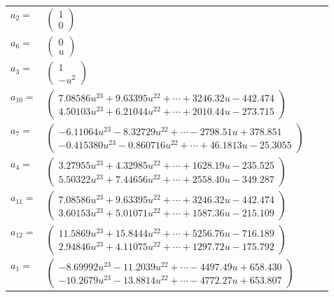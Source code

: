 \documentclass[1p]{elsarticle_modified}
\theoremstyle{definition}
\begin{document}
\begin{tabular}{m{7pt} m{180pt} m{7pt} m{180pt} }
\flushright $a_{2}=$&$\begin{pmatrix}1\\0\end{pmatrix}$ \\
\flushright $a_{6}=$&$\begin{pmatrix}0\\u\end{pmatrix}$ \\
\flushright $a_{3}=$&$\begin{pmatrix}1\\- u^2\end{pmatrix}$ \\
\flushright $a_{10}=$&$\begin{pmatrix}7.08586 u^{23}+9.63395 u^{22}+\cdots+3246.32 u-442.474\\4.50103 u^{23}+6.21044 u^{22}+\cdots+2010.44 u-273.715\end{pmatrix}$ \\
\flushright $a_{7}=$&$\begin{pmatrix}-6.11064 u^{23}-8.32729 u^{22}+\cdots-2798.51 u+378.851\\-0.415380 u^{23}-0.860716 u^{22}+\cdots+46.1813 u-25.3055\end{pmatrix}$ \\
\flushright $a_{4}=$&$\begin{pmatrix}3.27955 u^{23}+4.32985 u^{22}+\cdots+1628.19 u-235.525\\5.50322 u^{23}+7.44656 u^{22}+\cdots+2558.40 u-349.287\end{pmatrix}$ \\
\flushright $a_{11}=$&$\begin{pmatrix}7.08586 u^{23}+9.63395 u^{22}+\cdots+3246.32 u-442.474\\3.60153 u^{23}+5.01071 u^{22}+\cdots+1587.36 u-215.109\end{pmatrix}$ \\
\flushright $a_{12}=$&$\begin{pmatrix}11.5869 u^{23}+15.8444 u^{22}+\cdots+5256.76 u-716.189\\2.94846 u^{23}+4.11075 u^{22}+\cdots+1297.72 u-175.792\end{pmatrix}$ \\
\flushright $a_{1}=$&$\begin{pmatrix}-8.69992 u^{23}-11.2039 u^{22}+\cdots-4497.49 u+658.430\\-10.2679 u^{23}-13.8814 u^{22}+\cdots-4772.27 u+653.807\end{pmatrix}$ \\

\end{tabular}
\end{document}
